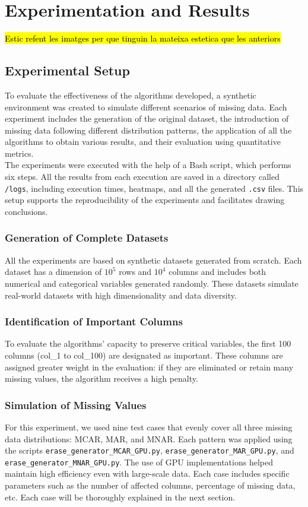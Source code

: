 \documentclass[a4paper,12pt]{article}
\begin{document}
\newpage
\section{Experimentation and Results}

\hl{Estic refent les imatges per que tinguin la mateixa estetica que les anteriors}
\subsection{Experimental Setup}
To evaluate the effectiveness of the algorithms developed, a synthetic environment was created to simulate different scenarios of missing data. Each experiment includes the generation of the original dataset, the introduction of missing data following different distribution patterns, the application of all the algorithms to obtain various results, and their evaluation using quantitative metrics. \\

The experiments were executed with the help of a Bash script, which performs six steps. All the results from each execution are saved in a directory called \texttt{/logs}, including execution times, heatmaps, and all the generated \texttt{.csv} files. This setup supports the reproducibility of the experiments and facilitates drawing conclusions.

\subsubsection{Generation of Complete Datasets}
All the experiments are based on synthetic datasets generated from scratch. Each dataset has a dimension of $10^5$ rows and $10^4$ columns and includes both numerical and categorical variables generated randomly. These datasets simulate real-world datasets with high dimensionality and data diversity.

\subsubsection{Identification of Important Columns} 
To evaluate the algorithms' capacity to preserve critical variables, the first 100 columns (col\_1 to col\_100) are designated as important. These columns are assigned greater weight in the evaluation: if they are eliminated or retain many missing values, the algorithm receives a high penalty.

\subsubsection{Simulation of Missing Values}
For this experiment, we used nine test cases that evenly cover all three missing data distributions: MCAR, MAR, and MNAR. Each pattern was applied using the scripts \texttt{erase\_generator\_MCAR\_GPU.py}, \texttt{erase\_generator\_MAR\_GPU.py}, and \texttt{erase\_generator\_MNAR\_GPU.py}. The use of GPU implementations helped maintain high efficiency even with large-scale data. Each case includes specific parameters such as the number of affected columns, percentage of missing data, etc. Each case will be thoroughly explained in the next section.
\end{document}
